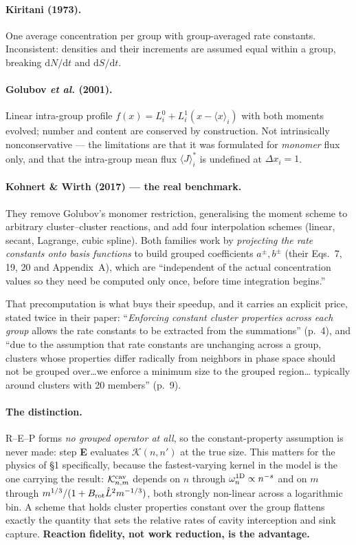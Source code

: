 \documentclass[11pt,a4paper]{article}
\begin{document}
\paragraph{Kiritani (1973).} One average concentration per group with
group-averaged rate constants. Inconsistent: densities and their increments are
assumed equal within a group, breaking $\mathrm{d}N/\mathrm{d}t$ and
$\mathrm{d}S/\mathrm{d}t$.

\paragraph{Golubov \emph{et al.} (2001).} Linear intra-group profile
$f(x)=L^0_i+L^1_i(x-\langle x\rangle_i)$ with both moments evolved; number and
content are conserved by construction. Not intrinsically nonconservative --- the
limitations are that it was formulated for \emph{monomer} flux only, and that the
intra-group mean flux $\langle J\rangle^*_i$ is undefined at $\Delta x_i=1$.

\paragraph{Kohnert \& Wirth (2017) --- the real benchmark.} They remove Golubov's
monomer restriction, generalising the moment scheme to arbitrary cluster--cluster
reactions, and add four interpolation schemes (linear, secant, Lagrange, cubic
spline). Both families work by \emph{projecting the rate constants onto basis
functions} to build grouped coefficients $a^{\pm},b^{\pm}$ (their Eqs.~7, 19, 20
and Appendix~A), which are ``independent of the actual concentration values so
they need be computed only once, before time integration begins.''

That precomputation is what buys their speedup, and it carries an explicit price,
stated twice in their paper: ``\emph{Enforcing constant cluster properties across
each group} allows the rate constants to be extracted from the summations'' (p.~4),
and ``due to the assumption that rate constants are unchanging across a group,
clusters whose properties differ radically from neighbors in phase space should
not be grouped over\ldots we enforce a minimum size to the grouped region\ldots
typically around clusters with 20 members'' (p.~9).

\paragraph{The distinction.} R--E--P forms \emph{no grouped operator at all}, so
the constant-property assumption is never made: step \textbf{E} evaluates
$\mathcal{K}(n,n')$ at the true size. This matters for the physics of \S1
specifically, because the fastest-varying kernel in the model is the one carrying
the result: $\mathcal{K}^{\rm cav}_{n,m}$ depends on $n$ through
$\omega^{\rm 1D}_n\propto n^{-s}$ and on $m$ through
$m^{1/3}/(1+B_{\rm rot}\hat L^2m^{-1/3})$, both strongly non-linear across a
logarithmic bin. A scheme that holds cluster properties constant over the group
flattens exactly the quantity that sets the relative rates of cavity interception
and sink capture. \textbf{Reaction fidelity, not work reduction, is the advantage.}
\end{document}
